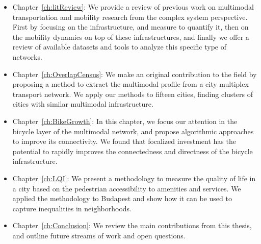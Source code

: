 \begin{itemize}
    \item Chapter~\ref{ch:litReview}: We provide a review of previous work on multimodal transportation and mobility research from the complex system perspective. First by focusing on the infrastructure, and measure to quantify it, then on the mobility dynamics on top of these infrastructures, and finally we offer a review of available datasets and tools to analyze this specific type of networks.
    \item Chapter~\ref{ch:OverlapCensus}: We make an original contribution to the field by proposing a method to extract the multimodal profile from a city multiplex transport network. We apply our methods to fifteen cities, finding clusters of cities with similar multimodal infrastructure.
    \item Chapter~\ref{ch:BikeGrowth}: In this chapter, we focus our attention in the bicycle layer of the multimodal network, and propose algorithmic approaches to improve its connectivity. We found that focalized investment has the potential to rapidly improves the connectedness and directness of the bicycle infrastructure.
    \item Chapter~\ref{ch:LQI}: We present a methodology to measure the quality of life in a city based on the pedestrian accessibility to amenities and services. We applied the methodology to Budapest and show how it can be used to capture inequalities in neighborhoods. 
    \item Chapter~\ref{ch:Conclusion}: We review the main contributions from this thesis, and outline future streams of work and open questions. 
\end{itemize}